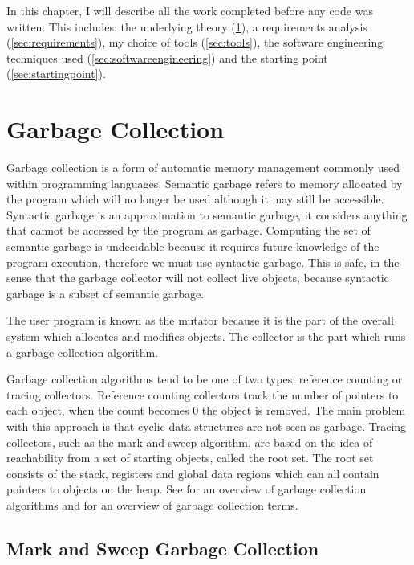 \documentclass[../diss.tex]{subfiles}
\begin{document}
In this chapter, I will describe all the work completed before any code was written. This includes: the underlying theory (\cref{sec:gctheory}), a requirements analysis (\cref{sec:requirements}), my choice of tools (\cref{sec:tools}), the software engineering techniques used (\cref{sec:softwareengineering}) and the starting point (\cref{sec:startingpoint}).

\section{Garbage Collection} \label{sec:gctheory}

Garbage collection is a form of automatic memory management commonly used within programming languages. Semantic garbage refers to memory allocated by the program which will no longer be used although it may still be accessible. Syntactic garbage is an approximation to semantic garbage, it considers anything that cannot be accessed by the program as garbage. Computing the set of semantic garbage is undecidable because it requires future knowledge of the program execution, therefore we must use syntactic garbage. This is safe, in the sense that the garbage collector will not collect live objects, because syntactic garbage is a subset of semantic garbage.

The user program is known as the mutator because it is the part of the overall system which allocates and modifies objects. The collector is the part which runs a garbage collection algorithm.

Garbage collection algorithms tend to be one of two types: reference counting or tracing collectors. Reference counting collectors\cite{referencecounting} track the number of pointers to each object, when the count becomes 0 the object is removed. The main problem with this approach is that cyclic data-structures are not seen as garbage. Tracing collectors, such as the mark and sweep algorithm, are based on the idea of reachability from a set of starting objects, called the root set. The root set consists of the stack, registers and global data regions which can all contain pointers to objects on the heap. See \cite{overview} for an overview of garbage collection algorithms and \cite{terms} for an overview of garbage collection terms.


\subsection{Mark and Sweep Garbage Collection} \label{sec:markandsweep}
\end{document}
